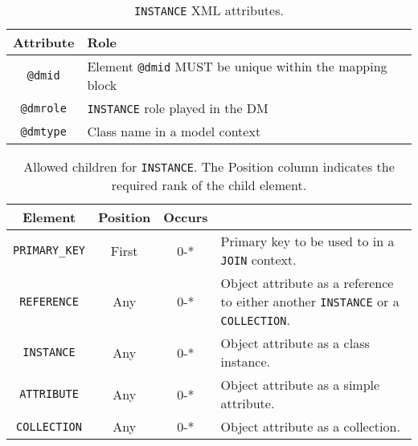 \begin{table}[!htbp]
\small
\centering
\begin{tabulary}{\linewidth}{|c|J|}       
       \hline 
            \textbf{Attribute} & 
            \textbf {Role}\\
       \hline         \hline  
            \texttt{@dmid} & 
            Element  \texttt{@dmid}  MUST be unique within the mapping block  \\
        \hline 
            \texttt{@dmrole} & 
            \texttt{INSTANCE} role played in the DM \\
        \hline 
            \texttt{@dmtype} & 
            Class name in a model context\\
        \hline 
     \end{tabulary}
     \caption{\texttt{INSTANCE} XML attributes.} 
     \label{tbl:instance-att}
 \end{table}   
 


 
\begin{table}[!htbp]
\small
\centering
\begin{tabulary}{\linewidth}{|c |c |c|J|}
    \hline 
        \textbf{Element} &
        \textbf{Position} &
        \textbf{Occurs} &
        \\
    \hline      \hline  
        \texttt{PRIMARY\_KEY}  &        
        First &           
        0-* &
        Primary key to be used to in a \texttt{JOIN} context.\\
    \hline    
        \texttt{REFERENCE}  &        
        Any &           
        0-* &
         Object attribute as a reference to either another \texttt{INSTANCE} or a \texttt{COLLECTION}. \\
    \hline    
        \texttt{INSTANCE} &           
        Any &           
        0-* &
         Object attribute as a class instance. \\
    \hline    
        \texttt{ATTRIBUTE} &           
        Any &           
        0-* &
       Object attribute as a simple attribute. \\
    \hline    
        \texttt{COLLECTION} &           
        Any &           
        0-* &
         Object attribute  as a collection.\\
    \hline 
\end{tabulary}
     \caption{Allowed children for \texttt{INSTANCE}. The Position column indicates the required rank of the child element.} 
     \label{tbl:instance-chilren}
\end{table}
 
